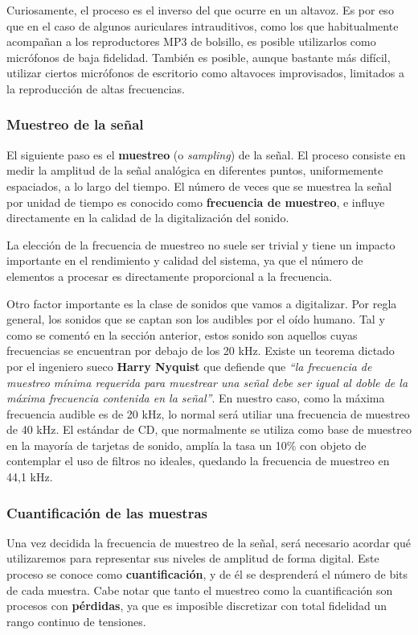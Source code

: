 Curiosamente, el proceso es el inverso del que ocurre en un altavoz. Es por eso
que en el caso de algunos auriculares intrauditivos, como los que habitualmente
acompañan a los reproductores MP3 de bolsillo, es posible utilizarlos como
micrófonos de baja fidelidad. También es posible, aunque bastante más difícil,
utilizar ciertos micrófonos de escritorio como altavoces improvisados, limitados
a la reproducción de altas frecuencias.

\subsubsection{Muestreo de la señal}
\label{sec:nyquist}
El siguiente paso es el \textbf{muestreo} (o \textit{sampling}) de la señal. El
proceso consiste en medir la amplitud de la señal analógica en diferentes
puntos, uniformemente espaciados, a lo largo del tiempo. El número de veces que
se muestrea la señal por unidad de tiempo es conocido como \textbf{frecuencia de
  muestreo}, e influye directamente en la calidad de la digitalización del sonido.

La elección de la frecuencia de muestreo no suele ser trivial y tiene un impacto
importante en el rendimiento y calidad del sistema, ya que el número de
elementos a procesar es directamente proporcional a la frecuencia. 

Otro factor importante es la clase de sonidos que vamos a digitalizar. Por regla
general, los sonidos que se captan son los audibles por el oído humano. Tal y
como se comentó en la sección anterior, estos sonido son aquellos cuyas
frecuencias se encuentran por debajo de los 20 kHz. Existe un teorema dictado
por el ingeniero sueco \textbf{Harry Nyquist} que defiende que \textit{``la
  frecuencia de muestreo mínima requerida para muestrear una señal debe ser
  igual al doble de la máxima frecuencia contenida en la señal''}. En nuestro
caso, como la máxima frecuencia audible es de 20 kHz, lo normal será utiliar una
frecuencia de muestreo de 40 kHz. El estándar de CD, que normalmente se utiliza
como base de muestreo en la mayoría de tarjetas de sonido, amplía la tasa un
10\% con objeto de contemplar el uso de filtros no ideales, quedando la
frecuencia de muestreo en 44,1 kHz.

\subsubsection{Cuantificación de las muestras}

Una vez decidida la frecuencia de muestreo de la señal, será necesario acordar
qué utilizaremos para representar sus niveles de amplitud de forma digital. Este
proceso se conoce como \textbf{cuantificación}, y de él se desprenderá el número
de bits de cada muestra. Cabe notar que tanto el muestreo como la cuantificación
son procesos con \textbf{pérdidas}, ya que es imposible discretizar con total
fidelidad un rango continuo de tensiones.

